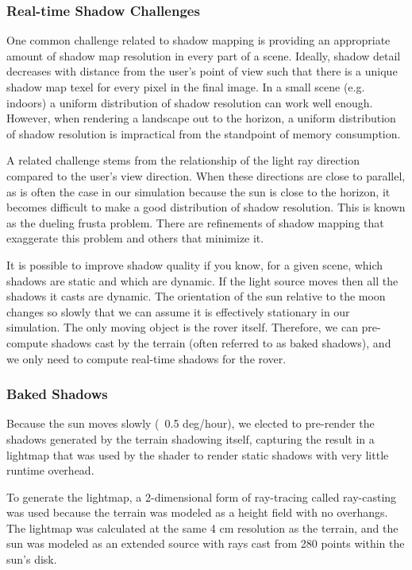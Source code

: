 \documentclass[twocolumn,letterpaper]{IEEEAerospaceCLS}  %
\begin{document}
\subsubsection{Real-time Shadow Challenges}
One common challenge related to shadow mapping is providing an appropriate amount of shadow map resolution in every part of a scene. 
Ideally, shadow detail decreases with distance from the user's point of view such that there is a unique shadow map texel for every pixel in the final image. 
In a small scene (e.g. indoors) a uniform distribution of shadow resolution can work well enough. 
However, when rendering a landscape out to the horizon, a uniform distribution of shadow resolution is impractical from the standpoint of memory consumption.

A related challenge stems from the relationship of the light ray direction compared to the user's view direction. 
When these directions are close to parallel, as is often the case in our simulation because the sun is close to the horizon, it becomes difficult to make a good distribution of shadow resolution. 
This is known as the dueling frusta problem. There are refinements of shadow mapping that exaggerate this problem and others that minimize it.

It is possible to improve shadow quality if you know, for a given scene, which shadows are static and which are dynamic. 
If the light source moves then all the shadows it casts are dynamic. 
The orientation of the sun relative to the moon changes so slowly that we can assume it is effectively stationary in our simulation. 
The only moving object is the rover itself. 
Therefore, we can pre-compute shadows cast by the terrain (often referred to as baked shadows), and we only need to compute real-time shadows for the rover.

\subsubsection{Baked Shadows}

Because the sun moves slowly (~0.5 deg/hour), we elected to pre-render the shadows generated by the terrain shadowing itself, capturing the result in a lightmap that was used by the shader to render static shadows with very little runtime overhead.

To generate the lightmap, a 2-dimensional form of ray-tracing called ray-casting was used because the terrain was modeled as a height field with no overhangs.  
The lightmap was calculated at the same 4 cm resolution as the terrain, and the sun was modeled as an extended source with rays cast from 280 points within the sun's disk.
\end{document}
